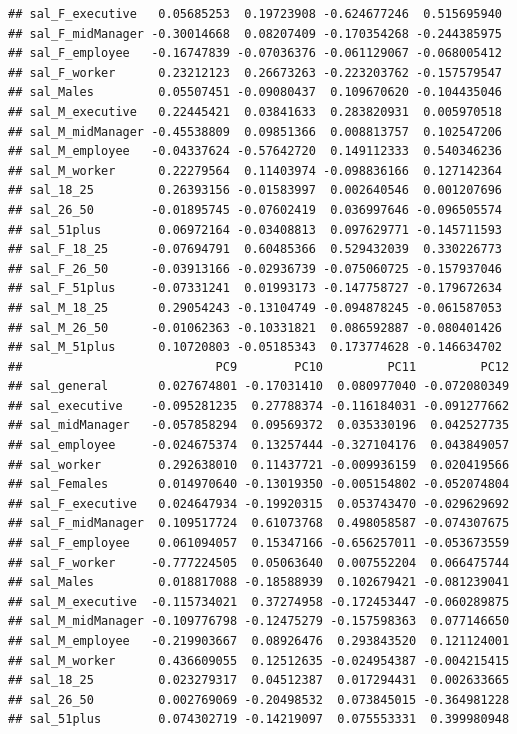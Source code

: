\documentclass[]{article}
\begin{document}
\begin{verbatim}
## sal_F_executive   0.05685253  0.19723908 -0.624677246  0.515695940
## sal_F_midManager -0.30014668  0.08207409 -0.170354268 -0.244385975
## sal_F_employee   -0.16747839 -0.07036376 -0.061129067 -0.068005412
## sal_F_worker      0.23212123  0.26673263 -0.223203762 -0.157579547
## sal_Males         0.05507451 -0.09080437  0.109670620 -0.104435046
## sal_M_executive   0.22445421  0.03841633  0.283820931  0.005970518
## sal_M_midManager -0.45538809  0.09851366  0.008813757  0.102547206
## sal_M_employee   -0.04337624 -0.57642720  0.149112333  0.540346236
## sal_M_worker      0.22279564  0.11403974 -0.098836166  0.127142364
## sal_18_25         0.26393156 -0.01583997  0.002640546  0.001207696
## sal_26_50        -0.01895745 -0.07602419  0.036997646 -0.096505574
## sal_51plus        0.06972164 -0.03408813  0.097629771 -0.145711593
## sal_F_18_25      -0.07694791  0.60485366  0.529432039  0.330226773
## sal_F_26_50      -0.03913166 -0.02936739 -0.075060725 -0.157937046
## sal_F_51plus     -0.07331241  0.01993173 -0.147758727 -0.179672634
## sal_M_18_25       0.29054243 -0.13104749 -0.094878245 -0.061587053
## sal_M_26_50      -0.01062363 -0.10331821  0.086592887 -0.080401426
## sal_M_51plus      0.10720803 -0.05185343  0.173774628 -0.146634702
##                           PC9        PC10         PC11         PC12
## sal_general       0.027674801 -0.17031410  0.080977040 -0.072080349
## sal_executive    -0.095281235  0.27788374 -0.116184031 -0.091277662
## sal_midManager   -0.057858294  0.09569372  0.035330196  0.042527735
## sal_employee     -0.024675374  0.13257444 -0.327104176  0.043849057
## sal_worker        0.292638010  0.11437721 -0.009936159  0.020419566
## sal_Females       0.014970640 -0.13019350 -0.005154802 -0.052074804
## sal_F_executive   0.024647934 -0.19920315  0.053743470 -0.029629692
## sal_F_midManager  0.109517724  0.61073768  0.498058587 -0.074307675
## sal_F_employee    0.061094057  0.15347166 -0.656257011 -0.053673559
## sal_F_worker     -0.777224505  0.05063640  0.007552204  0.066475744
## sal_Males         0.018817088 -0.18588939  0.102679421 -0.081239041
## sal_M_executive  -0.115734021  0.37274958 -0.172453447 -0.060289875
## sal_M_midManager -0.109776798 -0.12475279 -0.157598363  0.077146650
## sal_M_employee   -0.219903667  0.08926476  0.293843520  0.121124001
## sal_M_worker      0.436609055  0.12512635 -0.024954387 -0.004215415
## sal_18_25         0.023279317  0.04512387  0.017294431  0.002633665
## sal_26_50         0.002769069 -0.20498532  0.073845015 -0.364981228
## sal_51plus        0.074302719 -0.14219097  0.075553331  0.399980948

\end{verbatim}
\end{document}
